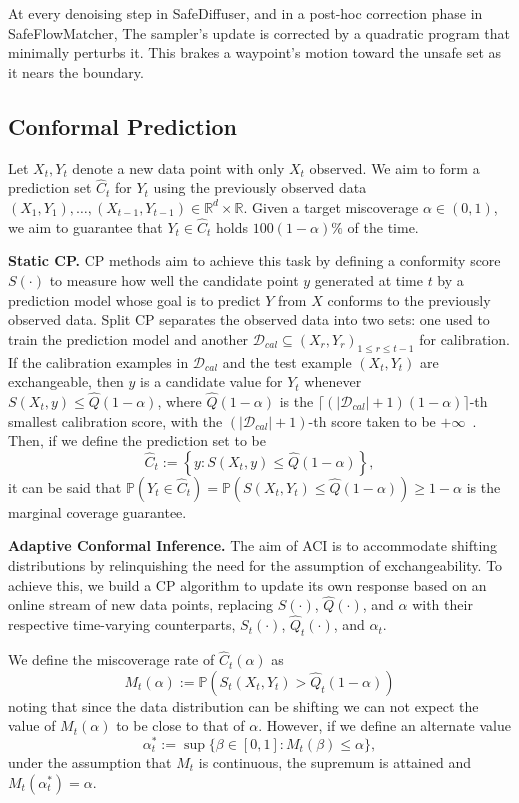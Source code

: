 \documentclass[letterpaper]{article} %
\begin{document}
At every denoising step in SafeDiffuser, and in a post-hoc correction phase in SafeFlowMatcher, The sampler's update is corrected by a quadratic program that minimally perturbs it. This brakes a waypoint's motion toward the unsafe set as it nears the
boundary.

\subsection{Conformal Prediction}
Let \(X_{t}, Y_{t}\) denote a new data point with only \(X_{t}\) observed. We aim to form a prediction set \(\hat{C}_t\) for \(Y_t\) using the previously observed data \(
(X_1, Y_1), \ldots, (X_{t-1}, Y_{t-1}) \in \mathbb{R}^d \times \mathbb{R}
\). Given a target miscoverage \(\alpha \in (0,1)\), we aim to guarantee that \(Y_t \in \hat{C}_t\) holds \(100(1-\alpha)\%\) of the time.

 \textbf{Static CP.} CP methods aim to achieve this task by defining a conformity score \(S(\cdot)\) to measure how well the candidate point \(y\) generated at time \(t\) by a prediction model whose goal is to predict \(Y\) from \(X\) conforms to the previously observed data.
Split CP separates the observed data into two sets: one used to train the prediction model and another \(\mathcal{D}_{cal} \subseteq {(X_r,Y_r)}_{1 \le r \le t-1}\) for calibration. If the calibration examples in \(\mathcal{D}_{cal}\) and the test
example \((X_t,Y_t)\) are exchangeable, then \(y\) is a candidate value for \(Y_t\) whenever \(S(X_t,y) \le \hat{Q}(1-\alpha)\), where \(\hat{Q}(1-\alpha)\) is the
\(\lceil(|\mathcal{D}_{cal}|+1)(1-\alpha)\rceil\)-th smallest calibration score, with the
\((|\mathcal{D}_{cal}|+1)\)-th score taken to be \(+\infty\)~\cite{gibbs2024conformal}.
Then, if we define the prediction set to be 
\[\hat{C}_{t}:=\left\{y:S(X_t,y)\leq \hat{Q}(1-\alpha)\right\},\]
it can be said that
\(
\mathbb{P}(Y_t \in \hat{C}_t) = \mathbb{P}(S(X_t, Y_t) \le \hat{Q}(1-\alpha)) \geq 1-\alpha
\) is the marginal coverage guarantee.

\textbf{Adaptive Conformal Inference.} The aim of ACI is to accommodate shifting distributions by relinquishing the need for the assumption of exchangeability. To achieve this, we build a CP algorithm to update its own response based on an online stream of new data points, replacing \(S(\cdot)\), \(\hat{Q}(\cdot)\), and \(\alpha\) with their respective time-varying  counterparts, \(S_t(\cdot)\), \(\hat{Q}_t(\cdot)\), and \(\alpha_t\).

We define the miscoverage rate of \(\hat{C}_t(\alpha)\) as
\[M_t(\alpha):=\mathbb{P}\!\left(S_t(X_t,Y_t)>\hat{Q}_t(1-\alpha)\right)\]
noting that since the data distribution can be shifting we can not expect the value of \(M_t(\alpha)\) to be close to that of \(\alpha\). However, if we define an alternate value
\[
\alpha_t^* := \sup\{\beta \in [0,1] : M_t(\beta) \le \alpha\},
\]
under the assumption that \(M_t\) is continuous, the supremum is attained and \(M_t(\alpha_t^*)=\alpha\).
\end{document}
